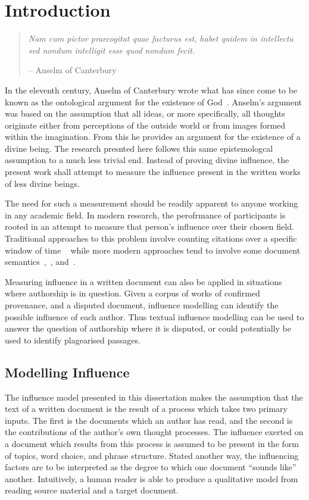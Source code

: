 \documentclass[../dissertation.tex]{subfiles}
\begin{document}
\chapter{Introduction}
\begin{quote}
\textit{Nam cum pictor praecogitat quae facturus est, habet quidem in
intellectu sed nondum intelligit esse quod nondum fecit.}

-- Anselm of Canterbury~\cite{anselm}
\end{quote}
In the eleventh century, Anselm of Canterbury wrote what has since
come to be known as the ontological argument for the existence of
God~\cite{anselm}.  Anselm's argument was based on the assumption that
all ideas, or more specifically, all thoughts originate either from
perceptions of the outside world or from images formed within the
imagination.  From this he provides an argument for the existence of
a divine being.  The research presnted here follows this same
epistemologcal assumption to a much less trivial end.
Instead of proving divine influence, the present work shall attempt to
measure the influence present in the written works of less divine beings.

The need for such a measurement should be readily apparent to anyone
working in any academic field.  In modern research, the perofrmance of 
participants is rooted in an attempt to measure that person's
influence over their chosen field.  Traditional approaches to this
problem involve counting citations over a specific window of time
~\cite{adler2009}
while more modern approaches tend to involve some document
semantics~\cite{dietz2007},~\cite{jiang2014}, and~\cite{**buneman**}.

Measuring influence in a written document can also be applied in
situations where authorship is in question.  Given a corpus of works
of confirmed provenance, and a disputed document, influence modelling
can identify the possible influence of each author.  Thus textual
influence modelling can be used to answer the question of authorship
where it is disputed, or could potentially be used to identify
plagearised passages.  


\section{Modelling Influence}
The influence model presented in this dissertation makes the
assumption that the text of a written document is the result of
a process which takes two primary inputs.  The first is the documents
which an author has read, and the second is the contributions of the
author's own thought processes.  The influence exerted on a document
which results from this process is assumed to be present in the form
of topics, word choice, and phrase structure.  Stated another way, the
influencing factors are to be interpreted as the degree to which one
document ``sounds like'' another.  Intuitively, a human reader is able 
to produce a qualitative model from reading source material and
a target document.  
\end{document}

